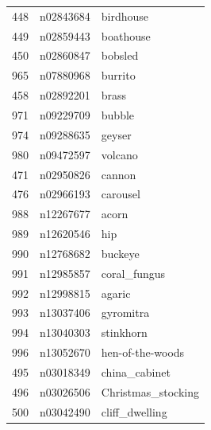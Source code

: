 \begin{table}
\begin{tabular}{cll}
448 & n02843684 & birdhouse \\
449 & n02859443 & boathouse \\
450 & n02860847 & bobsled \\
965 & n07880968 & burrito \\
458 & n02892201 & brass \\
971 & n09229709 & bubble \\
974 & n09288635 & geyser \\
980 & n09472597 & volcano \\
471 & n02950826 & cannon \\
476 & n02966193 & carousel \\
988 & n12267677 & acorn \\
989 & n12620546 & hip \\
990 & n12768682 & buckeye \\
991 & n12985857 & coral_fungus \\
992 & n12998815 & agaric \\
993 & n13037406 & gyromitra \\
994 & n13040303 & stinkhorn \\
996 & n13052670 & hen-of-the-woods \\
495 & n03018349 & china_cabinet \\
496 & n03026506 & Christmas_stocking \\
500 & n03042490 & cliff_dwelling \\
\bottomrule
\end{tabular}
\end{table}
